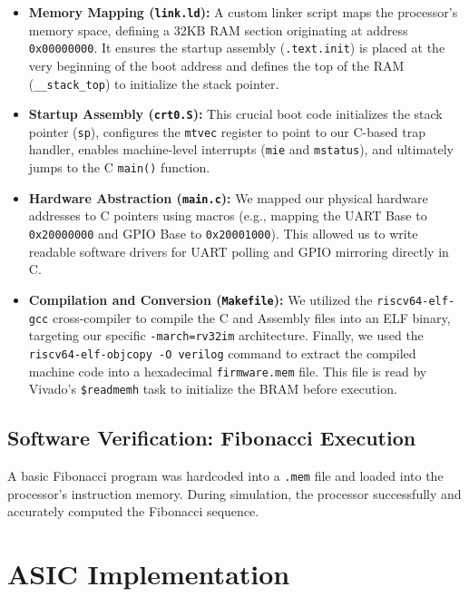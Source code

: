 \documentclass[11pt,a4paper]{article}
\begin{document}
\begin{itemize}
    \item \textbf{Memory Mapping (\texttt{link.ld}):} A custom linker script maps the processor's memory space, defining a 32KB RAM section originating at address \texttt{0x00000000}. It ensures the startup assembly (\texttt{.text.init}) is placed at the very beginning of the boot address  and defines the top of the RAM (\texttt{\_\_stack\_top}) to initialize the stack pointer.
    
    \item \textbf{Startup Assembly (\texttt{crt0.S}):} This crucial boot code initializes the stack pointer (\texttt{sp}), configures the \texttt{mtvec} register to point to our C-based trap handler, enables machine-level interrupts (\texttt{mie} and \texttt{mstatus}), and ultimately jumps to the C \texttt{main()} function.
    
    \item \textbf{Hardware Abstraction (\texttt{main.c}):} We mapped our physical hardware addresses to C pointers using macros (e.g., mapping the UART Base to \texttt{0x20000000} and GPIO Base to \texttt{0x20001000}). This allowed us to write readable software drivers for UART polling and GPIO mirroring directly in C.
    
    \item \textbf{Compilation and Conversion (\texttt{Makefile}):} We utilized the \texttt{riscv64-elf-gcc} cross-compiler to compile the C and Assembly files into an ELF binary, targeting our specific \texttt{-march=rv32im} architecture. Finally, we used the \texttt{riscv64-elf-objcopy -O verilog} command  to extract the compiled machine code into a hexadecimal \texttt{firmware.mem} file. This file is read by Vivado's \texttt{\$readmemh} task to initialize the BRAM before execution.
\end{itemize}

\subsection{Software Verification: Fibonacci Execution}
A basic Fibonacci program was hardcoded into a \texttt{.mem} file and loaded into the processor's instruction memory. During simulation, the processor successfully and accurately computed the Fibonacci sequence.  

\section{ASIC Implementation}
\end{document}
